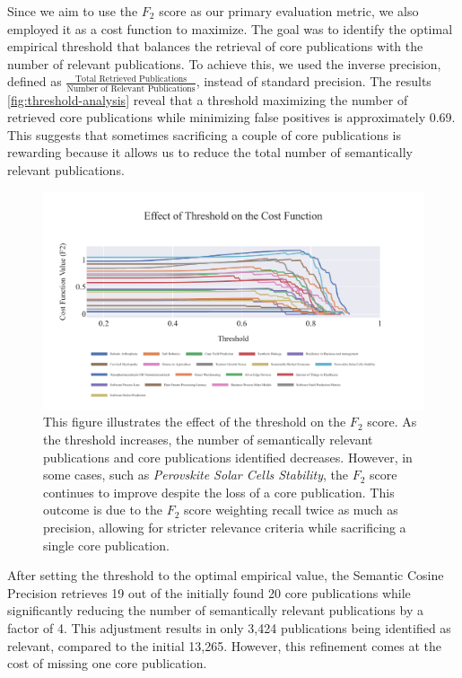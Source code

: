 Since we aim to use the $F_2$ score as our primary evaluation metric, we also employed it as a cost function to maximize. The goal was to identify the optimal empirical threshold that balances the retrieval of core publications with the number of relevant publications. To achieve this, we used the inverse precision, defined as $\frac{\text{Total Retrieved Publications}}{\text{Number of Relevant Publications}}$, instead of standard precision. The results \autoref{fig:threshold-analysis} reveal that a threshold maximizing the number of retrieved core publications while minimizing false positives is approximately 0.69. This suggests that sometimes sacrificing a couple of core publications is rewarding because it allows us to reduce the total number of semantically relevant publications.

\begin{figure}
	\centering	
	\includegraphics[scale=0.7]{pics/threshold-analysis.pdf}
	\caption[Semantic Cosine Threshold: Empirical Analysis]{This figure illustrates the effect of the threshold on the $F_2$ score. As the threshold increases, the number of semantically relevant publications and core publications identified decreases. However, in some cases, such as \textit{Perovskite Solar Cells Stability}, the $F_2$ score continues to improve despite the loss of a core publication. This outcome is due to the $F_2$ score weighting recall twice as much as precision, allowing for stricter relevance criteria while sacrificing a single core publication.}\label{fig:threshold-analysis}
\end{figure}

After setting the threshold to the optimal empirical value, the Semantic Cosine Precision retrieves 19 out of the initially found 20 core publications while significantly reducing the number of semantically relevant publications by a factor of 4. This adjustment results in only 3,424 publications being identified as relevant, compared to the initial 13,265. However, this refinement comes at the cost of missing one core publication.

